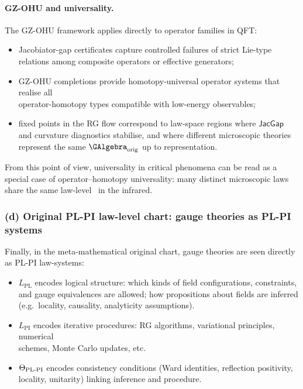 \documentclass[11pt]{book}
\theoremstyle{plain}
\theoremstyle{definition}
\begin{document}
\paragraph{GZ-OHU and universality.}

The GZ-OHU framework applies directly to operator families in QFT:

\begin{itemize}
  \item Jacobiator-gap certificates capture controlled failures of
        strict Lie-type relations among composite operators or
        effective generators;
  \item GZ-OHU completions provide homotopy-universal operator
        systems that realise all \\ operator-homotopy types compatible
        with low-energy observables;
  \item fixed points in the RG flow correspond to law-space regions
        where $\mathsf{JacGap}$ and curvature diagnostics stabilise,
        and where different microscopic theories represent the same
        $\GAlgebra_{\mathrm{orig}}$ up to representation.
\end{itemize}

From this point of view, universality in critical phenomena can be
read as a special case of operator--homotopy universality: many
distinct microscopic laws share the same law-level \GAlgebra\ in the
infrared.



\subsubsection*{(d) Original PL-PI law-level chart: gauge theories as PL-PI systems}

Finally, in the meta-mathematical original chart, gauge theories are
seen directly as PL-PI law-systems:

\begin{itemize}
  \item $L_{\mathrm{PL}}$ encodes logical structure: which kinds of
        field configurations, constraints, and gauge equivalences are
        allowed; how propositions about fields are inferred (e.g.\
        locality, causality, analyticity assumptions).
  \item $L_{\mathrm{PI}}$ encodes iterative procedures: RG algorithms,
        variational principles, numerical \\ schemes, Monte Carlo updates,
        etc.
  \item $\Theta_{\mathrm{PL\text- PI}}$ encodes consistency conditions
        (Ward identities, reflection positivity, locality, unitarity)
        linking inference and procedure.
\end{itemize}
\end{document}

